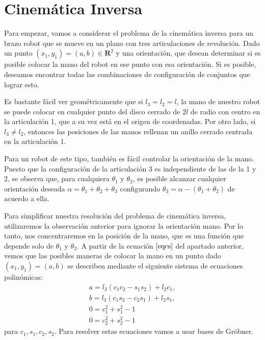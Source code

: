 \chapter{Cinemática Inversa}

Para empezar, vamos a considerar el problema de la cinemática inversa para un brazo robot que se mueve en un plano con tres articulaciones de revolución. Dado un punto $(x_{1},y_{1})=(a, b) \in \mathbf{R}^2 $ y una orientación, que desean determinar si es posible colocar la mano del robot en ese punto con esa orientación. Si es posible, deseamos encontrar todas las combinaciones de configuración de conjuntos que lograr esto.

Es bastante fácil ver geométricamente que si $l_{3}=l_{2}=l$, la mano de nuestro robot se puede colocar en cualquier punto del disco cerrado de $2l$ de radio con centro en la articulación 1, que a su vez está en el origen de coordenadas. Por otro lado, si $l_{3} \neq l_{2}$, entonces las posiciones de las manos rellenan un anillo cerrado centrada en la articulación 1. 

Para un robot de este tipo, también es fácil controlar la orientación de la mano. Puesto que la configuración de la articulación 3 es independiente de las de la 1 y 2, se observa que, para cualquiera $\theta_{1}$ y $\theta_{2}$, es posible alcanzar cualquier orientación deseada $\alpha=\theta_{1}+\theta_{2}+\theta_{3}$ configurando $\theta_{3}=\alpha-(\theta_{1}+\theta_{2})$ de acuerdo a ella.

Para simplificar nuestra resolución del problema de cinemática inversa, utilizaremos la observación anterior para ignorar la orientación mano. Por lo tanto, nos concentraremos en la posición de la mano, que es una función que depende solo de $\theta_{1}$ y $\theta_{2}$. A partir de la ecuación $\ref{eqcs}$ del apartado anterior, vemos que las posibles maneras de colocar la mano en un punto dado $(x_{1},y_{1}) = (a,b)$ se describen mediante el siguiente sistema de ecuaciones polinómicas:
\begin{eqnarray} \nonumber 
a = l_{3}(c_{1}c_{2} - s_{1}s_{2}) + l_{2}c_{1},\\  \nonumber 
b = l_{3}(c_{1}s_{2} - c_{2}s_{1}) + l_{2}s_{1},\\
0 = c_{1}^{2} + s_{1}^{2} - 1\\ \nonumber 
0 = c_{2}^{2} + s_{2}^{2} - 1
\end{eqnarray}
para $c_{1},s_{1},c_{2},s_{2}$. 
Para resolver estas ecuaciones vamos a usar bases de Gröbner.

